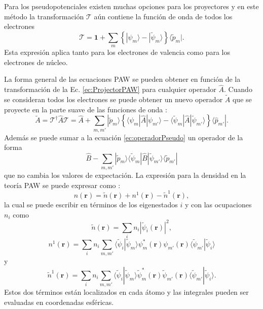    Para los pseudopotenciales existen muchas opciones para los proyectores y en este m\'etodo la transformaci\'on $\mathcal{T}$ a\'un contiene la funci\'on de onda de todos los electrones \cite{doi:10.1063/1.2338035}
   \begin{equation}
   \mathcal{T} = \pmb{1} + \sum_m \left\{ |\psi_m\rangle - |\tilde{\psi}_m \rangle \right\} \langle \tilde{p}_m |. \label{ec:ProjectorPAW}
   \end{equation}
   Esta expresi\'on aplica tanto para los electrones de valencia como para los electrones de n\'ucleo.
   \newline
   \par La forma general de las ecuaciones PAW se pueden obtener en funci\'on de la transformaci\'on de la Ec. \ref{ec:ProjectorPAW} para cualquier operador $\hat{A}$. Cuando se consideran todos los electrones se puede obtener un nuevo operador $\tilde{A}$ que se proyecte en la parte suave de las funciones de onda \cite{PhysRevB.50.17953}:
   \begin{equation}
   \tilde{A}= \mathcal{T} ^{\dagger} \hat{A} \mathcal{T} = \hat{A} + \sum_{m,m'} |\tilde{p}_m \rangle \left\{\langle \psi_m | \hat{A} | \psi_{m'} \rangle - \langle \tilde{\psi}_m | \hat{A} | \tilde{\psi}_{m'} \rangle \right\} \langle \hat{p}_{m'}| \label{ec:operadorPseudo}.
   \end{equation}
   Adem\'as se puede sumar a la ecuaci\'on \ref{ec:operadorPseudo} un operador de la forma
   \begin{equation}
   \hat{B}-\sum_{m,m'} |\tilde{p}_m \rangle \langle \tilde{\psi}_m | \hat{B} | \tilde{\psi}_{m'} \rangle \langle \tilde{p}_{m'}| 
   \end{equation}
   que no cambia los valores de expectaci\'on. La expresi\'on para la densidad en la teor\'ia PAW se puede expresar como \cite{PhysRevB.50.17953}:
   \begin{equation}
   n(\pmb{r}) = \tilde{n} (\pmb{r}) + n^1 (\pmb{r}) - \tilde{n}^1 (\pmb{r}), \label{ec:densidadPAW}
   \end{equation}
   la cual se puede escribir en t\'erminos de los eigenestados $i$ y con las ocupaciones $n_i$ como
   \begin{equation}
   \tilde{n} (\pmb{r}) = \sum_i n_i |\tilde{\psi}_i (\pmb{r})|^2, \label{ec:densPW}
   \end{equation}
   \begin{equation}
   n^1 (\pmb{r}) = \sum_i n_i \sum_{m,m'} \langle \tilde{\psi}_i | \tilde{\psi}_m \rangle \psi_m ^* (\pmb{r}) \psi_{m'} (\pmb{r}) \langle \tilde{\psi}_{m'} | \tilde{\psi}_i \rangle \label{ec:n1} 
   \end{equation}
   y
   \begin{equation}
   \tilde{n}^1 (\pmb{r}) = \sum_i n_i \sum_{m,m'} \langle \tilde{\psi}_i | \tilde{\psi}_m \rangle \tilde{\psi}_m ^* (\pmb{r}) \tilde{\psi}_{m'} (\pmb{r}) \langle \tilde{\psi}_{m'} | \tilde{\psi}_i \rangle. \label{ec:tn1}
   \end{equation}
   Estos dos t\'erminos est\'an localizados en cada \'atomo y las integrales pueden ser evaluadas  en coordenadas esf\'ericas.  
    \endinput